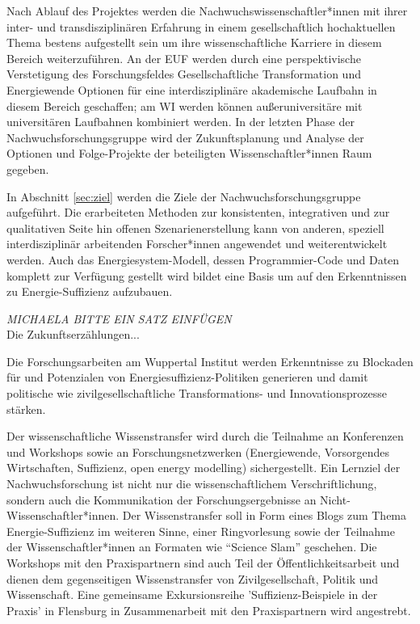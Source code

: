 \documentclass[a4paper,11pt,twoside]{scrartcl}
\begin{document}
Nach Ablauf des Projektes werden die Nachwuchswissenschaftler*innen mit ihrer inter- und transdisziplinären Erfahrung in einem gesellschaftlich hochaktuellen Thema bestens aufgestellt sein um ihre wissenschaftliche Karriere in diesem Bereich weiterzuführen. An der EUF werden durch eine perspektivische Verstetigung des Forschungsfeldes Gesellschaftliche Transformation und Energiewende Optionen für eine interdisziplinäre akademische Laufbahn in diesem Bereich geschaffen; am WI werden können außeruniversitäre mit universitären Laufbahnen kombiniert werden. In der letzten Phase der Nachwuchsforschungsgruppe wird der Zukunftsplanung und Analyse der Optionen und Folge-Projekte der beteiligten Wissenschaftler*innen Raum gegeben. 

In Abschnitt \ref{sec:ziel} werden die Ziele der Nachwuchsforschungsgruppe aufgeführt. Die erarbeiteten Methoden zur konsistenten, integrativen und zur qualitativen Seite hin offenen Szenarienerstellung kann von anderen, speziell interdisziplinär arbeitenden Forscher*innen angewendet und weiterentwickelt werden. Auch das Energiesystem-Modell, dessen Programmier-Code und Daten komplett zur Verfügung gestellt wird bildet eine Basis um auf den Erkenntnissen zu Energie-Suffizienz aufzubauen. 

\textit{MICHAELA BITTE EIN SATZ EINFÜGEN}\\
Die Zukunftserzählungen... 

Die Forschungsarbeiten am Wuppertal Institut werden Erkenntnisse zu Blockaden für und Potenzialen von Energiesuffizienz-Politiken generieren und damit politische wie zivilgesellschaftliche Transformations- und Innovationsprozesse stärken.

Der wissenschaftliche Wissenstransfer wird durch die Teilnahme an Konferenzen und Workshops sowie an Forschungsnetzwerken (Energiewende, Vorsorgendes Wirtschaften, Suffizienz, open energy modelling) sichergestellt. 
Ein Lernziel der Nachwuchsforschung ist nicht nur die wissenschaftlichem Verschriftlichung, sondern auch die Kommunikation der Forschungsergebnisse an Nicht-Wissenschaftler*innen. Der Wissenstransfer soll in Form eines Blogs zum Thema Energie-Suffizienz im weiteren Sinne, einer Ringvorlesung sowie der Teilnahme der Wissenschaftler*innen an Formaten wie ``Science Slam'' geschehen. Die Workshops mit den Praxispartnern sind auch Teil der Öffentlichkeitsarbeit und dienen dem gegenseitigen Wissenstransfer von Zivilgesellschaft, Politik und Wissenschaft. Eine gemeinsame Exkursionsreihe 'Suffizienz-Beispiele in der Praxis' in Flensburg in Zusammenarbeit mit den Praxispartnern wird angestrebt.
\end{document}

